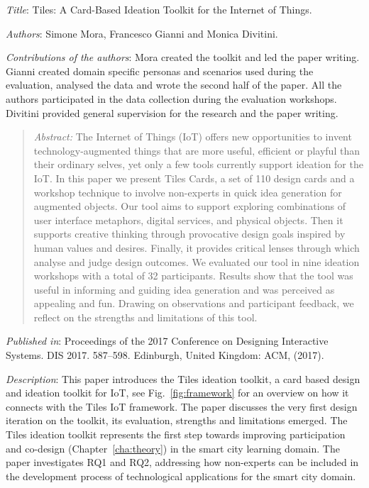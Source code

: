 \emph{Title}: Tiles: A Card-Based Ideation Toolkit for the Internet of Things.

\emph{Authors}: Simone Mora, Francesco Gianni and Monica Divitini.

\emph{Contributions of the authors}: Mora created the toolkit and led the paper writing. Gianni created domain specific personas and scenarios used during the evaluation, analysed the data and wrote the second half of the paper. All the authors participated in the data collection during the evaluation workshops. Divitini provided general supervision for the research and the paper writing.

\begin{quote}
	\emph{Abstract:} The Internet of Things (IoT) offers new opportunities to invent technology-augmented things that are more useful, efficient or playful than their ordinary selves, yet only a few tools currently support ideation for the IoT. In this paper we present Tiles Cards, a set of 110 design cards and a workshop technique to involve non-experts in quick idea generation for augmented objects. Our tool aims to support exploring combinations of user interface metaphors, digital services, and physical objects. Then it supports creative thinking through provocative design goals inspired by human values and desires. Finally, it provides critical lenses through which analyse and judge design outcomes. We evaluated our tool in nine ideation workshops with a total of 32 participants. Results show that the tool was useful in informing and guiding idea generation and was perceived as appealing and fun. Drawing on observations and participant feedback, we reflect on the strengths and limitations of this tool.
\end{quote}

\emph{Published in}: Proceedings of the 2017 Conference on Designing Interactive Systems. DIS 2017. 587--598. Edinburgh, United Kingdom: ACM, (2017).

\emph{Description}: This paper introduces the Tiles ideation toolkit, a card based design and ideation toolkit for IoT, see Fig.~\ref{fig:framework} for an overview on how it connects with the Tiles IoT framework. The paper discusses the very first design iteration on the toolkit, its evaluation, strengths and limitations emerged. The Tiles ideation toolkit represents the first step towards improving participation and co-design (Chapter~\ref{cha:theory}) in the smart city learning domain.
The paper investigates RQ1 and RQ2, addressing how non-experts can be included in the development process of technological applications for the smart city domain.


